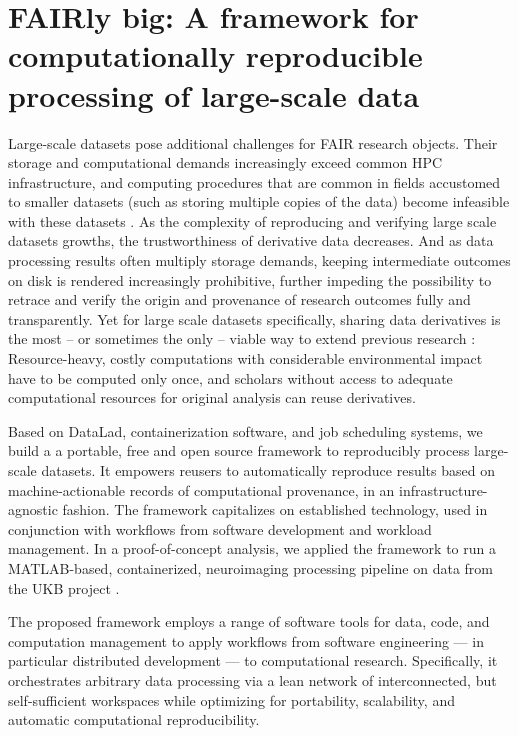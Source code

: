\pagebreak

\section{FAIRly big: A framework for computationally reproducible processing of large-scale data}

Large-scale datasets pose additional challenges for \gls{FAIR} research objects.
Their storage and computational demands increasingly exceed common \gls{HPC} infrastructure, and computing procedures that are common in fields accustomed to smaller datasets (such as storing multiple copies of the data) become infeasible with these datasets \citep{horien2021hitchhiker}.
As the complexity of reproducing and verifying large scale datasets growths, the trustworthiness of derivative data decreases.
And as data processing results often multiply storage demands, keeping intermediate outcomes on disk is rendered increasingly prohibitive, further impeding the possibility to retrace and verify the origin and provenance of research outcomes fully and transparently.
Yet for large scale datasets specifically, sharing data derivatives is the most -- or sometimes the only -- viable way to extend previous research \citep{craddock2013neuro}:
Resource-heavy, costly computations with considerable environmental impact \citep{portegies2020ecological} have to be computed only once, and scholars without access to adequate computational resources for original analysis can reuse derivatives.


Based on DataLad, containerization software, and job scheduling systems, we build a a portable, free and open source framework to reproducibly process large-scale datasets.
It empowers reusers to automatically reproduce results based on machine-actionable records of computational provenance, in an infrastructure-agnostic fashion.
The framework capitalizes on established technology, used in conjunction with workflows from software development and workload management.
In a proof-of-concept analysis, we applied the framework to run a MATLAB-based, containerized, neuroimaging processing pipeline on data from the UKB project \citep[][comprising 76 TB in 43 million files under strict usage constraints]{matthews2015uk}.

The proposed framework employs a range of software tools for data, code, and computation management to apply workflows from software engineering — in particular distributed development — to computational research. Specifically, it orchestrates arbitrary data processing via a lean network of interconnected, but self-sufficient workspaces while optimizing for portability, scalability, and automatic computational reproducibility.


